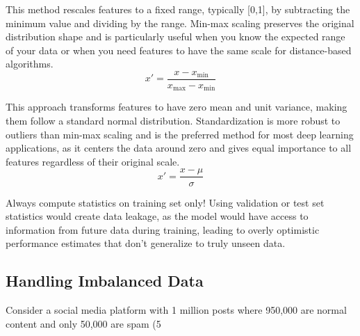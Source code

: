 \begin{definition}
This method rescales features to a fixed range, typically [0,1], by subtracting the minimum value and dividing by the range. Min-max scaling preserves the original distribution shape and is particularly useful when you know the expected range of your data or when you need features to have the same scale for distance-based algorithms.
\begin{equation}
x' = \frac{x - x_{\min}}{x_{\max} - x_{\min}}
\end{equation}
\end{definition}

\begin{definition}
This approach transforms features to have zero mean and unit variance, making them follow a standard normal distribution. Standardization is more robust to outliers than min-max scaling and is the preferred method for most deep learning applications, as it centers the data around zero and gives equal importance to all features regardless of their original scale.
\begin{equation}
x' = \frac{x - \mu}{\sigma}
\end{equation}
\end{definition}

Always compute statistics on training set only!  Using validation or test set statistics would create data leakage, as the model would have access to information from future data during training, leading to overly optimistic performance estimates that don't generalize to truly unseen data.


\subsection{Handling Imbalanced Data}

\begin{example}
Consider a social media platform with 1 million posts where 950,000 are normal content and only 50,000 are spam (5%
\end{example}

